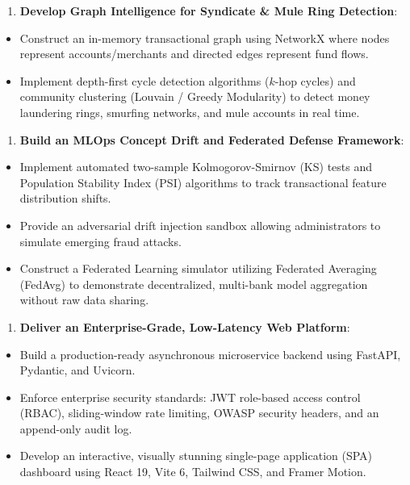\documentclass[12pt,a4paper,oneside]{report}
\begin{document}
\begin{enumerate}[leftmargin=0.35in]
\item \textbf{Develop Graph Intelligence for Syndicate \& Mule Ring Detection}:
\end{enumerate}
\begin{itemize}[leftmargin=0.35in]
\item Construct an in-memory transactional graph using NetworkX where nodes represent accounts/merchants and directed edges represent fund flows.
\item Implement depth-first cycle detection algorithms ($k$-hop cycles) and community clustering (Louvain / Greedy Modularity) to detect money laundering rings, smurfing networks, and mule accounts in real time.
\end{itemize}

\begin{enumerate}[leftmargin=0.35in]
\item \textbf{Build an MLOps Concept Drift and Federated Defense Framework}:
\end{enumerate}
\begin{itemize}[leftmargin=0.35in]
\item Implement automated two-sample Kolmogorov-Smirnov (KS) tests and Population Stability Index (PSI) algorithms to track transactional feature distribution shifts.
\item Provide an adversarial drift injection sandbox allowing administrators to simulate emerging fraud attacks.
\item Construct a Federated Learning simulator utilizing Federated Averaging (FedAvg) to demonstrate decentralized, multi-bank model aggregation without raw data sharing.
\end{itemize}

\begin{enumerate}[leftmargin=0.35in]
\item \textbf{Deliver an Enterprise-Grade, Low-Latency Web Platform}:
\end{enumerate}
\begin{itemize}[leftmargin=0.35in]
\item Build a production-ready asynchronous microservice backend using FastAPI, Pydantic, and Uvicorn.
\item Enforce enterprise security standards: JWT role-based access control (RBAC), sliding-window rate limiting, OWASP security headers, and an append-only audit log.
\item Develop an interactive, visually stunning single-page application (SPA) dashboard using React 19, Vite 6, Tailwind CSS, and Framer Motion.
\end{itemize}
\end{document}
